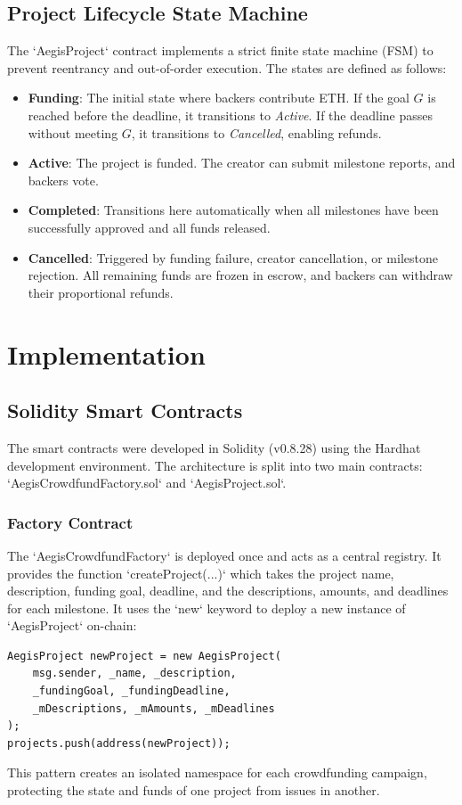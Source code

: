 \documentclass[conference]{IEEEtran}
\begin{document}
\subsection{Project Lifecycle State Machine}
The `AegisProject` contract implements a strict finite state machine (FSM) to prevent reentrancy and out-of-order execution. The states are defined as follows:
\begin{itemize}
	\item \textbf{Funding}: The initial state where backers contribute ETH. If the goal $G$ is reached before the deadline, it transitions to \textit{Active}. If the deadline passes without meeting $G$, it transitions to \textit{Cancelled}, enabling refunds.
	\item \textbf{Active}: The project is funded. The creator can submit milestone reports, and backers vote.
	\item \textbf{Completed}: Transitions here automatically when all milestones have been successfully approved and all funds released.
	\item \textbf{Cancelled}: Triggered by funding failure, creator cancellation, or milestone rejection. All remaining funds are frozen in escrow, and backers can withdraw their proportional refunds.
\end{itemize}

\section{Implementation}

\subsection{Solidity Smart Contracts}
The smart contracts were developed in Solidity (v0.8.28) using the Hardhat development environment. The architecture is split into two main contracts: `AegisCrowdfundFactory.sol` and `AegisProject.sol`.

\subsubsection{Factory Contract}
The `AegisCrowdfundFactory` is deployed once and acts as a central registry. It provides the function `createProject(...)` which takes the project name, description, funding goal, deadline, and the descriptions, amounts, and deadlines for each milestone. It uses the `new` keyword to deploy a new instance of `AegisProject` on-chain:
\begin{verbatim}
AegisProject newProject = new AegisProject(
    msg.sender, _name, _description,
    _fundingGoal, _fundingDeadline,
    _mDescriptions, _mAmounts, _mDeadlines
);
projects.push(address(newProject));
\end{verbatim}
This pattern creates an isolated namespace for each crowdfunding campaign, protecting the state and funds of one project from issues in another.
\end{document}

